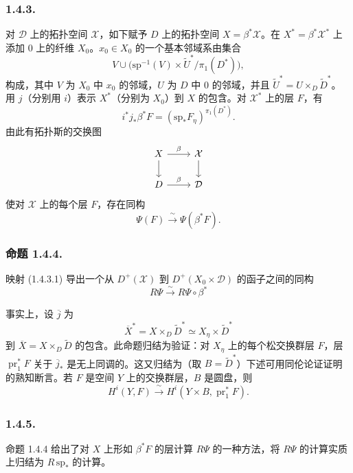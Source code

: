\subsubsection*{1.4.3.}
对 $\mathcal D$ 上的拓扑空间 $\mathcal X$，如下赋予 $D$ 上的拓扑空间 $X=\beta^*\mathcal X$。在 $X^*=\beta^*\mathcal X^*$ 上添加 $0$ 上的纤维 $X_0$。$x_0\in X_0$ 的一个基本邻域系由集合
\[
V\cup
\bigl(\mathrm{sp}^{-1}(V)\times\widetilde U^*/\pi_1(D^*)\bigr),
\]
构成，其中 $V$ 为 $X_0$ 中 $x_0$ 的邻域，$U$ 为 $D$ 中 $0$ 的邻域，并且 $\widetilde U^*=U\times_D\widetilde D^*$。
用 $j$（分别用 $i$）表示 $X^*$（分别为 $X_0$）到 $X$ 的包含。对 $\mathcal X^*$ 上的层 $F$，有
\[
i^*j_*\beta^*F
=(\mathrm{sp}_*F_\eta)^{\pi_1(D^*)}.
\]
由此有拓扑斯的交换图
\[
\begin{tikzcd}
X \arrow[r, "\beta"] \arrow[d]
  & \mathcal X \arrow[d] \\
D \arrow[r, "\beta"]
  & \mathcal D
\end{tikzcd}
\]
使对 $\mathcal X$ 上的每个层 $F$，存在同构
\begin{equation}\tag{1.4.3.1}
\Psi(F)\xrightarrow{\ \sim\ }\Psi(\beta^*F).
\end{equation}

\subsubsection*{命题 1.4.4.}
映射 (1.4.3.1) 导出一个从 $D^+(\mathcal X)$ 到 $D^+(X_0\times\mathcal D)$ 的函子之间的同构
\[
R\Psi\xrightarrow{\ \sim\ }R\Psi\circ\beta^*
\]

事实上，设 $\overline j$ 为
\[
\overline X^*=X\times_D\widetilde D^*
\simeq X_\eta\times\widetilde D^*
\]
到 $\overline X=X\times_D\widetilde D$ 的包含。此命题归结为验证：对 $X_\eta$ 上的每个松交换群层 $F$，层 $\operatorname{pr}_1^*F$ 关于 $\overline j_*$ 是无上同调的。这又归结为（取 $B=\widetilde D^*$）下述可用同伦论证证明的熟知断言。若 $F$ 是空间 $Y$ 上的交换群层，$B$ 是圆盘，则
\[
H^i(Y,F)\xrightarrow{\ \sim\ }
H^i(Y\times B,\operatorname{pr}_1^*F).
\]

\subsubsection*{1.4.5.}
命题 1.4.4 给出了对 $X$ 上形如 $\beta^*F$ 的层计算 $R\Psi$ 的一种方法，将 $R\Psi$ 的计算实质上归结为 $R\,\mathrm{sp}_*$ 的计算。

